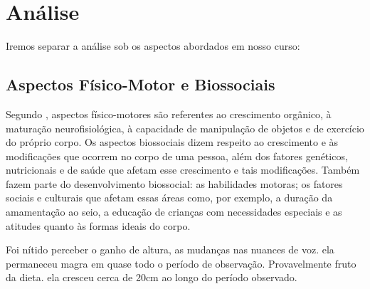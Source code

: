 \section{Análise}

Iremos separar a análise sob os aspectos abordados em nosso curso:

\subsection{Aspectos Físico-Motor e Biossociais}

Segundo , aspectos físico-motores são referentes ao crescimento orgânico, à maturação neurofisiológica, à capacidade de manipulação de objetos e de exercício do próprio corpo.
Os aspectos biossociais dizem respeito ao crescimento e às modificações que ocorrem no corpo de uma pessoa, além dos fatores genéticos, nutricionais e de saúde que afetam esse crescimento e tais modificações. Também fazem parte do desenvolvimento biossocial: as habilidades motoras; os fatores sociais e culturais que afetam essas áreas como, por exemplo, a duração da amamentação ao seio, a educação de crianças com necessidades especiais e as atitudes quanto às formas ideais do corpo.

Foi nítido perceber o ganho de altura, as mudanças nas nuances de voz. ela permaneceu magra em quase todo o período de observação. Provavelmente fruto da dieta. ela cresceu cerca de 20cm ao longo do período observado.


